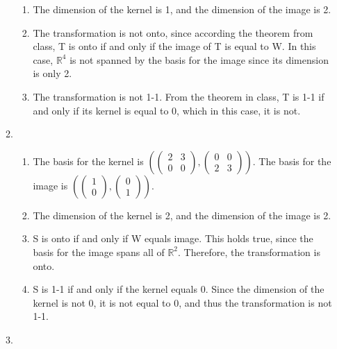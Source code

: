 \documentclass{article}
\begin{document}
\begin{enumerate}
\begin{enumerate}
\begin{enumerate}
\item The dimension of the kernel is 1, and the dimension of the image is 2.

\item The transformation is not onto, since according the theorem from class, T is onto if and only if the image of T is equal to W. In this case, $\mathbb{R}^4$ is not spanned by the basis for the image since its dimension is only 2.

\item The transformation is not 1-1. From the theorem in class, T is 1-1 if and only if its kernel is equal to 0, which in this case, it is not.

\end{enumerate}

\item

\begin{enumerate}

\item The basis for the kernel is $\left(\left(\begin{array}{cc} 2 & 3 \\ 0 & 0 \end{array}\right),\left(\begin{array}{cc} 0 & 0 \\ 2 & 3 \end{array}\right)\right)$. The basis for the image is $\left(\left(\begin{array}{c} 1 \\ 0 \end{array}\right), \left(\begin{array}{c} 0 \\ 1 \end{array}\right)\right)$.

\item The dimension of the kernel is 2, and the dimension of the image is 2.

\item S is onto if and only if W equals image. This holds true, since the basis for the image spans all of $\mathbb{R}^2$. Therefore, the transformation is onto.

\item S is 1-1 if and only if the kernel equals 0. Since the dimension of the kernel is not 0, it is not equal to 0, and thus the transformation is not 1-1.

\end{enumerate}

\item


\end{enumerate}
\end{enumerate}
\end{document}
